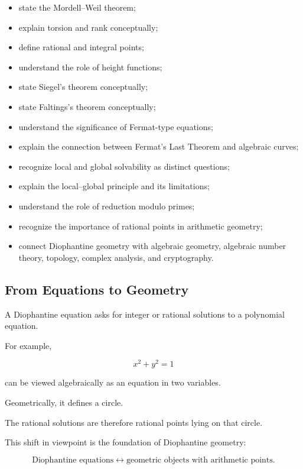 {\begin{itemize}
    \item state the Mordell--Weil theorem;
    \item explain torsion and rank conceptually;
    \item define rational and integral points;
    \item understand the role of height functions;
    \item state Siegel's theorem conceptually;
    \item state Faltings's theorem conceptually;
    \item understand the significance of Fermat-type equations;
    \item explain the connection between Fermat's Last Theorem and algebraic curves;
    \item recognize local and global solvability as distinct questions;
    \item explain the local--global principle and its limitations;
    \item understand the role of reduction modulo primes;
    \item recognize the importance of rational points in arithmetic geometry;
    \item connect Diophantine geometry with algebraic geometry, algebraic number
    theory, topology, complex analysis, and cryptography.
\end{itemize}
}

\subsection{From Equations to Geometry}
\label{subsec:diophantine-equations-to-geometry}

A Diophantine equation asks for integer or rational solutions to a polynomial
equation.

For example,

\[ x^2+y^2=1 \]

can be viewed algebraically as an equation in two variables.

Geometrically, it defines a circle.

The rational solutions are therefore rational points lying on that circle.

This shift in viewpoint is the foundation of Diophantine geometry:

\[
\boxed{
\text{Diophantine equations}
\longleftrightarrow
\text{geometric objects with arithmetic points}.
}
\]

